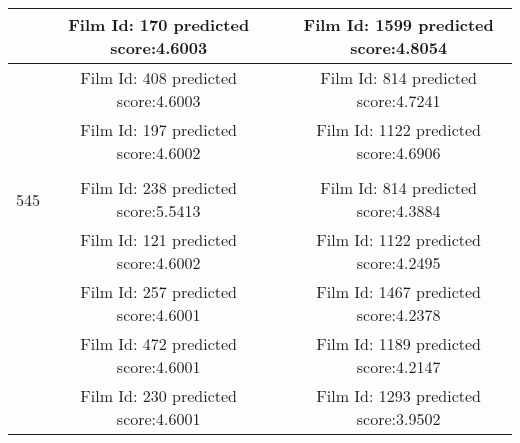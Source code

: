 \begin{longtable}{|c|c|c|c|}
\hline
\multicolumn{ 1}{|c|}{} & Film Id: 170 predicted score:4.6003 &            & Film Id: 1599 predicted score:4.8054 \\
\hline
\multicolumn{ 1}{|c|}{} & Film Id: 408 predicted score:4.6003 &            & Film Id: 814 predicted score:4.7241 \\
\hline
\multicolumn{ 1}{|c|}{} & Film Id: 197 predicted score:4.6002 &            & Film Id: 1122 predicted score:4.6906 \\
\hline
           &            &            &            \\
\hline
\multicolumn{ 1}{|c|}{545} & Film Id: 238 predicted score:5.5413 &            & Film Id: 814 predicted score:4.3884 \\
\hline
\multicolumn{ 1}{|c|}{} & Film Id: 121 predicted score:4.6002 &            & Film Id: 1122 predicted score:4.2495 \\
\hline
\multicolumn{ 1}{|c|}{} & Film Id: 257 predicted score:4.6001 &            & Film Id: 1467 predicted score:4.2378 \\
\hline
\multicolumn{ 1}{|c|}{} & Film Id: 472 predicted score:4.6001 &            & Film Id: 1189 predicted score:4.2147 \\
\hline
\multicolumn{ 1}{|c|}{} & Film Id: 230 predicted score:4.6001 &            & Film Id: 1293 predicted score:3.9502 \\


\end{longtable}
